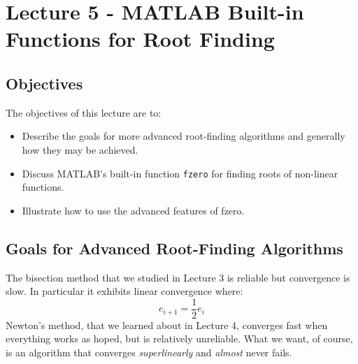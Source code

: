 \chapter{Lecture 5 - MATLAB Built-in Functions for Root Finding}
\label{ch:lec5n}
\section{Objectives}
The objectives of this lecture are to:
\begin{itemize}
\item Describe the goals for more advanced root-finding algorithms and generally how they may be achieved.
\item Discuss MATLAB's built-in function \lstinline[style=myMatlab]{fzero} for finding roots of non-linear functions.
\item Illustrate how to use the advanced features of fzero.
\end{itemize}
\setcounter{lstannotation}{0}

\section{Goals for Advanced Root-Finding Algorithms}

The bisection method that we studied in Lecture 3 is reliable but convergence is slow.  In particular it exhibits linear convergence where:
\begin{equation}
e_{i+1} = \frac{1}{2}e_{i}
\end{equation}
Newton's method, that we learned about in Lecture 4, converges fast when everything works as hoped, but is relatively unreliable.  What we want, of course, is an algorithm that converges \emph{superlinearly} and \emph{almost} never fails.

